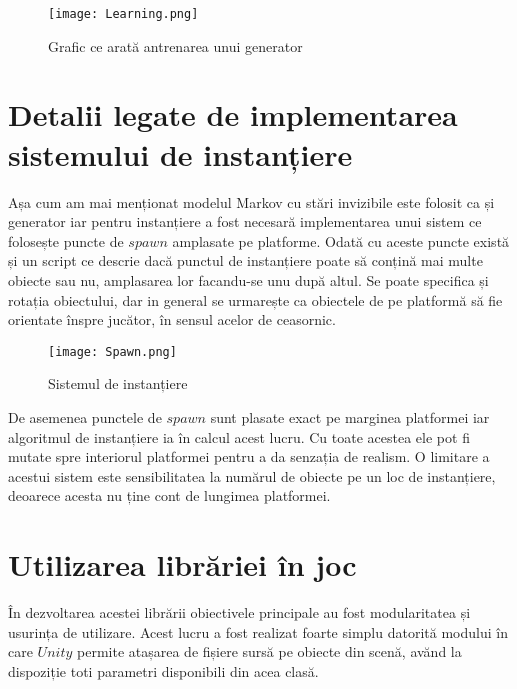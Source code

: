 \vspace{10mm}
\begin{figure}[H]
\centering
\texttt{[image: Learning.png]} \par
\caption{Grafic ce arată antrenarea unui generator}
\end{figure}



\section{Detalii legate de implementarea sistemului de instanțiere}

Așa cum am mai menționat modelul Markov cu stări invizibile este folosit ca și generator iar pentru instanțiere a fost necesară implementarea unui sistem ce folosește puncte de $spawn$ amplasate pe platforme. Odată cu aceste puncte există și un script ce descrie dacă punctul de instanțiere poate să conțină mai multe obiecte sau nu, amplasarea lor facandu-se unu după altul. Se poate specifica și rotația obiectului, dar in general se urmarește ca obiectele de pe platformă să fie orientate înspre jucător, în sensul acelor de ceasornic.\par

\vspace{10mm}
\begin{figure}[H]
\centering
\texttt{[image: Spawn.png]} \par
\caption{Sistemul de instanțiere}
\end{figure}

De asemenea punctele de $spawn$ sunt plasate exact pe marginea platformei iar algoritmul de instanțiere ia în calcul acest lucru. Cu toate acestea ele pot fi mutate spre interiorul platformei pentru a da senzația de realism. O limitare a acestui sistem este sensibilitatea la numărul de obiecte pe un loc de instanțiere, deoarece acesta nu ține cont de lungimea platformei.

\section{Utilizarea librăriei în joc}

În dezvoltarea acestei librării obiectivele principale au fost modularitatea și usurința de utilizare. Acest lucru a fost realizat foarte simplu datorită modului în care $Unity$ permite atașarea de fișiere sursă pe obiecte din scenă, avănd la dispoziție toti parametri disponibili din acea clasă.\par

